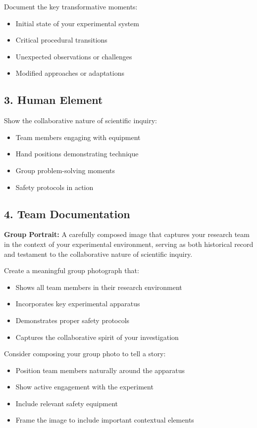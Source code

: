 \documentclass[11pt]{article}
\begin{document}
Document the key transformative moments:
\begin{itemize}[leftmargin=*]
    \item Initial state of your experimental system
    \item Critical procedural transitions
    \item Unexpected observations or challenges
    \item Modified approaches or adaptations
\end{itemize}

\subsection*{3. Human Element}

Show the collaborative nature of scientific inquiry:
\begin{itemize}[leftmargin=*]
    \item Team members engaging with equipment
    \item Hand positions demonstrating technique
    \item Group problem-solving moments
    \item Safety protocols in action
\end{itemize}

\subsection*{4. Team Documentation}

\begin{conceptbox}
\textbf{Group Portrait:} A carefully composed image that captures your research team in the context of your experimental environment, serving as both historical record and testament to the collaborative nature of scientific inquiry.
\end{conceptbox}

Create a meaningful group photograph that:
\begin{itemize}[leftmargin=*]
    \item Shows all team members in their research environment
    \item Incorporates key experimental apparatus
    \item Demonstrates proper safety protocols
    \item Captures the collaborative spirit of your investigation
\end{itemize}

Consider composing your group photo to tell a story:
\begin{itemize}[leftmargin=*]
    \item Position team members naturally around the apparatus
    \item Show active engagement with the experiment
    \item Include relevant safety equipment
    \item Frame the image to include important contextual elements
\end{itemize}
\end{document}
